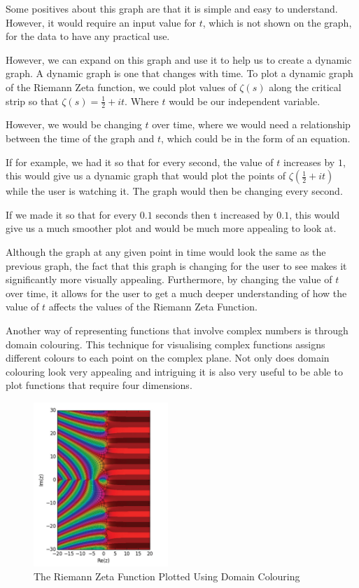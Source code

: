 \documentclass{article}
\begin{document}
Some positives about this graph are that it is simple and easy to understand. However, it would require an input value for $t$, which is not shown on the graph, for the data to have any practical use.

However, we can expand on this graph and use it to help us to create a dynamic graph. A dynamic graph is one that changes with time. To plot a dynamic graph of the Riemann Zeta function, we could plot values of $\zeta(s)$ along the critical strip so that $\zeta(s) = \frac{1}{2}+ it$. Where $t$ would be our independent variable.

However, we would be changing $t$ over time, where we would need a relationship between the time of the graph and $t$, which could be in the form of an equation.

If for example, we had it so that for every second, the value of $t$ increases by $1$, this would give us a dynamic graph that would plot the points of $\zeta(\frac{1}{2}+it)$ while the user is watching it. The graph would then be changing every second.

If we made it so that for every $0.1$ seconds then t increased by $0.1$, this would give us a much smoother plot and would be much more appealing to look at.

Although the graph at any given point in time would look the same as the previous graph, the fact that this graph is changing for the user to see makes it significantly more visually appealing. Furthermore, by changing the value of $t$ over time, it allows for the user to get a much deeper understanding of how the value of $t$ affects the values of the Riemann Zeta Function.

Another way of representing functions that involve complex numbers is through domain colouring. This technique for visualising complex functions assigns different colours to each point on the complex plane. Not only does domain colouring look very appealing and intriguing it is also very useful to be able to plot functions that require four dimensions.

\clearpage

\begin{figure}
    \centering
    \captionsetup{justification=centering}
    \includegraphics[width=2.0in]{domain-colouring-plot}
    \caption{The Riemann Zeta Function Plotted Using Domain Colouring}
\end{figure}
\end{document}
